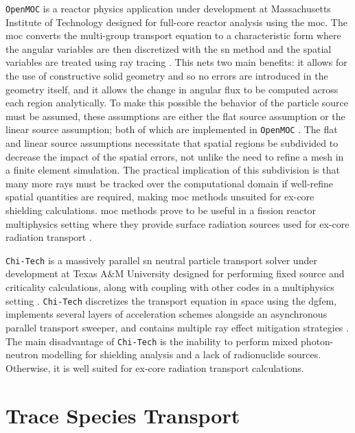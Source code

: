 \texttt{OpenMOC} is a reactor physics application under development at Massachusetts Institute of Technology \cite{openmoc} designed for full-core reactor analysis using the \acrfull{moc}. The \acrshort{moc} converts the multi-group transport equation to a characteristic form where the angular variables are then discretized with the \acrshort{sn} method and the spatial variables are treated using ray tracing \cite{applied_reactor_physics}. This nets two main benefits: it allows for the use of constructive solid geometry and so no errors are introduced in the geometry itself, and it allows the change in angular flux to be computed across each region analytically. To make this possible the behavior of the particle source must be assumed, these assumptions are either the flat source assumption or the linear source assumption; both of which are implemented in \texttt{OpenMOC} \cite{openmoc,gunow_linear_moc}. The flat and linear source assumptions necessitate that spatial regions be subdivided to decrease the impact of the spatial errors, not unlike the need to refine a mesh in a finite element simulation. The practical implication of this subdivision is that many more rays must be tracked over the computational domain if well-refine spatial quantities are required, making \acrshort{moc} methods unsuited for ex-core shielding calculations. \acrshort{moc} methods prove to be useful in a fission reactor multiphysics setting where they provide surface radiation sources used for ex-core radiation transport \cite{denovo_concrete}.

\texttt{Chi-Tech} is a massively parallel \acrshort{sn} neutral particle transport solver under development at Texas A\&M University designed for performing fixed source and criticality calculations, along with coupling with other codes in a multiphysics setting \cite{massively_parallel_sweeps}. \texttt{Chi-Tech} discretizes the transport equation in space using the \acrshort{dgfem}, implements several layers of acceleration schemes alongside an asynchronous parallel transport sweeper, and contains multiple ray effect mitigation strategies \cite{modified_sn}. The main disadvantage of \texttt{Chi-Tech} is the inability to perform mixed photon-neutron modelling for shielding analysis and a lack of radionuclide sources. Otherwise, it is well suited for ex-core radiation transport calculations.

\section{Trace Species Transport}
\label{lit_review:mass_transport}

